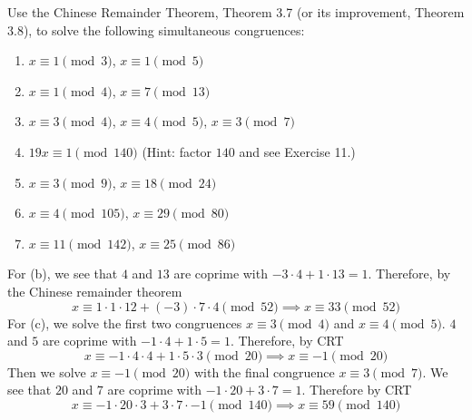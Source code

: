   \begin{exercise}[Shifrin 1.3.21]
    Use the Chinese Remainder Theorem, Theorem 3.7 (or its improvement, Theorem 3.8), to solve the following simultaneous congruences:
    \begin{enumerate}[label=\alph*.]
      \item $x \equiv 1 \pmod{3}$, $x \equiv 1 \pmod{5}$
      \item $x \equiv 1 \pmod{4}$, $x \equiv 7 \pmod{13}$
      \item $x \equiv 3 \pmod{4}$, $x \equiv 4 \pmod{5}$, $x \equiv 3 \pmod{7}$
      \item $19x \equiv 1 \pmod{140}$ (Hint: factor $140$ and see Exercise 11.)
      \item $x \equiv 3 \pmod{9}$, $x \equiv 18 \pmod{24}$
      \item $x \equiv 4 \pmod{105}$, $x \equiv 29 \pmod{80}$
      \item $x \equiv 11 \pmod{142}$, $x \equiv 25 \pmod{86}$
    \end{enumerate}
  \end{exercise}
  \begin{solution}
    For (b), we see that $4$ and $13$ are coprime with $-3 \cdot 4 + 1 \cdot 13 = 1$. Therefore, by the Chinese remainder theorem 
    \begin{equation}
      x \equiv 1 \cdot 1 \cdot 12 + (-3) \cdot 7 \cdot 4 \pmod{52} \implies x \equiv 33 \pmod{52}
    \end{equation}
    For (c), we solve the first two congruences $x \equiv 3 \pmod{4}$ and $x \equiv 4 \pmod{5}$. $4$ and $5$ are coprime with $-1 \cdot 4 + 1 \cdot 5 = 1$. Therefore, by CRT 
    \begin{equation}
      x \equiv -1 \cdot 4 \cdot 4 + 1 \cdot 5 \cdot 3 \pmod{20} \implies x \equiv -1 \pmod{20}
    \end{equation}
    Then we solve $x \equiv -1 \pmod{20}$ with the final congruence $x \equiv 3 \pmod{7}$. We see that $20$ and $7$ are coprime with $-1 \cdot 20 + 3 \cdot 7 = 1$. Therefore by CRT 
    \begin{equation}
      x \equiv -1 \cdot 20 \cdot 3 + 3 \cdot 7 \cdot -1 \pmod{140} \implies x \equiv 59 \pmod{140}
    \end{equation}
  \end{solution}
  
